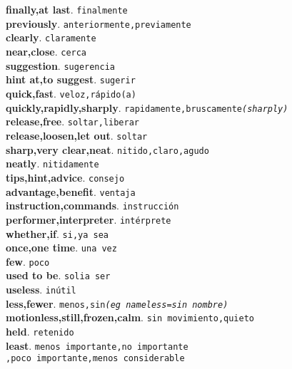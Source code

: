 \documentclass[twocolumn]{article}
\begin{document}
	\textsf{\textbf{finally,at last}}. \texttt{finalmente}\\
	\textsf{\textbf{previously}}. \texttt{anteriormente,previamente}\\
	\textsf{\textbf{clearly}}. \texttt{claramente}\\
	\textsf{\textbf{near,close}}. \texttt{cerca}\\
	\textsf{\textbf{suggestion}}. \texttt{sugerencia}\\
	\textsf{\textbf{hint at,to suggest}}. \texttt{sugerir}\\
	\textsf{\textbf{quick,fast}}. \texttt{veloz,r\'apido(a)}\\
	\textsf{\textbf{quickly,rapidly,sharply}}. \texttt{rapidamente,bruscamente{\scriptsize \textsl{(sharply)}}}\\
	\textsf{\textbf{release,free}}. \texttt{soltar,liberar}\\
	\textsf{\textbf{release,loosen,let out}}. \texttt{soltar}\\
	\textsf{\textbf{sharp,very clear,neat}}. \texttt{nitido,claro,agudo}\\
	\textsf{\textbf{neatly}}. \texttt{nitidamente}\\
	\textsf{\textbf{tips,hint,advice}}. \texttt{consejo}\\
	\textsf{\textbf{advantage,benefit}}. \texttt{ventaja}\\
	\textsf{\textbf{instruction,commands}}. \texttt{instrucci\'on}\\
	\textsf{\textbf{performer,interpreter}}. \texttt{int\'erprete}\\
	\textsf{\textbf{whether,if}}. \texttt{si,ya sea}\\
	\textsf{\textbf{once,one time}}. \texttt{una vez}\\
	\textsf{\textbf{few}}. \texttt{poco}\\
	\textsf{\textbf{used to be}}. \texttt{solia ser}\\
	\textsf{\textbf{useless}}. \texttt{in\'util}\\
	\textsf{\textbf{less,fewer}}. \texttt{menos,sin{\scriptsize \textsl{(eg nameless=sin nombre)}}}\\
	\textsf{\textbf{motionless,still,frozen,calm}}. \texttt{sin movimiento,quieto}\\
	\textsf{\textbf{held}}. \texttt{retenido}\\
	\textsf{\textbf{least}}. \texttt{menos importante,no importante\\,poco importante,menos considerable}\\
\end{document}
